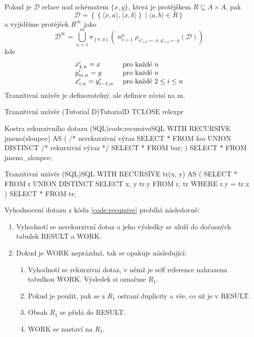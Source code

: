 Pokud je $\mathcal{D}$ relace nad schématem $\lbrace x, y \rbrace$, která je protějškem $R \subseteq A \times A$, pak
$$
\mathcal{D} = \left\{ \left\{ \langle x, a \rangle, \langle x, b \rangle \right\} \; | \; \langle a, b \rangle \in R \right\}
$$
a vyjídříme protějšek $R^{\infty}$ jako
$$
\mathcal{D}^{\infty} = \bigcup_{n = 1}^{m} \pi_{\left\{ x, y \right\}} \left( \Join_{i = 1}^{n} \rho _{x'_{i, n} \leftarrow x, y'_{i, n} \leftarrow y}(\mathcal{D}) \right)
$$
kde
$$
\begin{array}{l l}
x'_{1, n} = x & \text{ pro každé } n \\
y'_{m, n} = y & \text{ pro každé } n \\
x'_{i, n} = y'_{i-1,n} & \text{ pro každé } 2 \leq i \leq n
\end{array}
$$
Tranzitivní uzávěr je definovatelný, ale definice závisí na m.
\begin{upcode}{Tranzitivní uzávěr (Tutorial D)}{}{TutorialD}
TCLOSE relexpr
\end{upcode}
\begin{upcode}{Kostra rekurzivního dotazu (SQL)}{code:recursive}{SQL}
WITH RECURSIVE jmeno(sloupce) AS (
	/* nerekurzivní výraz
	SELECT	*
	FROM	foo
	UNION	DISTINCT
	/* rekurzivní výraz */
	SELECT	*
	FROM 	bar;
)
SELECT	*
FROM	jmeno_sloupce;
\end{upcode}
\begin{upcode}{Tranzitivní uzávěr (SQL)}{}{SQL}
WITH RECURSIVE tr(x, y) AS (
	SELECT	*
	FROM 	r
	UNION	DISTINCT
	SELECT	x, y tr.y FROM r, tr
	WHERE	r.y = tr.x
)
SELECT * FROM tr;
\end{upcode}
Vyhodnocení dotazu z kódu \ref{code:recursive} probíhá následovně:
\begin{enumerate}
\item Vyhodnotí se nerekurzivní dotaz a jeho výsledky se uloží do dočasných tabulek RESULT a WORK.
\item Dokud je WORK neprázdná, tak se opakuje následující:
\begin{enumerate}
\item Vyhodnotí se rekurzivní dotaz, v němž je self reference nahrazena tabulkou WORK. Výsledek si označme $R_{1}$.
\item Pokud je použit, pak se z $R_{1}$ ostraní duplicity a vše, co už je v RESULT.
\item Obsah $R_{1}$ se přidá do RESULT.
\item WORK se nastaví na $R_{1}$.
\end{enumerate}
\end{enumerate}